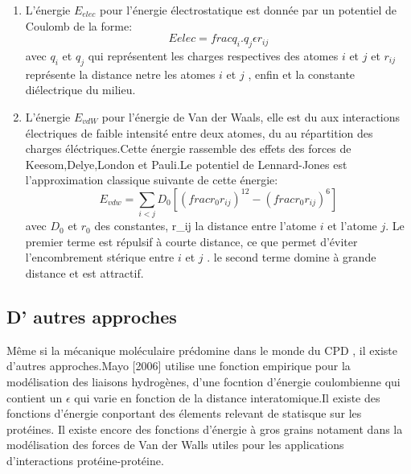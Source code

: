 \begin{enumerate}
  \label{VdW}
\item L'énergie $E_{elec}$ pour l'énergie électrostatique est donnée par un potentiel de Coulomb de la forme:
  \begin{equation}
    E{elec}= frac{q_i.q_j}{\epsilon r_{ij}}
  \end{equation}
  avec $q_i$ et $q_j$ qui représentent les charges respectives des atomes $i$ et $j$ et $r_{ij}$ représente la distance netre les atomes $i$ et $j$ , enfin \epsilon et la constante diélectrique du milieu.
\item L'énergie  $E_{vdW}$ pour l'énergie de Van der Waals, elle est du aux interactions électriques de faible intensité entre deux atomes, du au répartition des charges éléctriques.Cette énergie rassemble des effets des forces de Keesom,Delye,London et Pauli.Le potentiel de Lennard-Jones est l'approximation classique suivante de cette énergie:
  \begin{equation}
  E_{vdw} = \sum_{i<j}D_0 [(frac{r_0}{r_{ij}})^12 - (frac{r_0}{r_{ij}})^6]  
  \end{equation}
avec $D_0$ et $r_0$ des constantes, r_{ij} la distance entre l'atome $i$ et l'atome $j$. Le premier terme est répulsif à courte distance, ce que permet d'éviter l'encombrement stérique entre $i$ et $j$ . le second terme domine à grande distance et est attractif. 
  
\end{enumerate}

\subsection{D' autres approches}

Même si la mécanique moléculaire prédomine dans le monde du CPD , il existe d'autres approches.Mayo [2006] utilise une fonction empirique pour la modélisation des liaisons hydrogènes, d'une focntion d'énergie coulombienne qui contient un $\epsilon$ qui varie en fonction de la distance interatomique.Il existe des fonctions d'énergie  conportant des élements relevant de statisque sur les protéines. Il existe encore des fonctions d'énergie à gros grains notament dans la modélisation des forces de Van der Walls utiles pour les applications d'interactions protéine-protéine.

